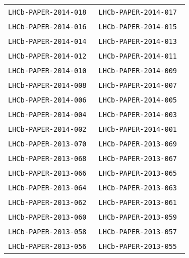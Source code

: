 \begin{center}
\begin{longtable}{ll}
\texttt{LHCb-PAPER-2014-018}~\cite{LHCb-PAPER-2014-018} &
\texttt{LHCb-PAPER-2014-017}~\cite{LHCb-PAPER-2014-017} \\
\texttt{LHCb-PAPER-2014-016}~\cite{LHCb-PAPER-2014-016} &
\texttt{LHCb-PAPER-2014-015}~\cite{LHCb-PAPER-2014-015} \\
\texttt{LHCb-PAPER-2014-014}~\cite{LHCb-PAPER-2014-014} &
\texttt{LHCb-PAPER-2014-013}~\cite{LHCb-PAPER-2014-013} \\
\texttt{LHCb-PAPER-2014-012}~\cite{LHCb-PAPER-2014-012} &
\texttt{LHCb-PAPER-2014-011}~\cite{LHCb-PAPER-2014-011} \\
\texttt{LHCb-PAPER-2014-010}~\cite{LHCb-PAPER-2014-010} &
\texttt{LHCb-PAPER-2014-009}~\cite{LHCb-PAPER-2014-009} \\
\texttt{LHCb-PAPER-2014-008}~\cite{LHCb-PAPER-2014-008} &
\texttt{LHCb-PAPER-2014-007}~\cite{LHCb-PAPER-2014-007} \\
\texttt{LHCb-PAPER-2014-006}~\cite{LHCb-PAPER-2014-006} &
\texttt{LHCb-PAPER-2014-005}~\cite{LHCb-PAPER-2014-005} \\
\texttt{LHCb-PAPER-2014-004}~\cite{LHCb-PAPER-2014-004} &
\texttt{LHCb-PAPER-2014-003}~\cite{LHCb-PAPER-2014-003} \\
\texttt{LHCb-PAPER-2014-002}~\cite{LHCb-PAPER-2014-002} &
\texttt{LHCb-PAPER-2014-001}~\cite{LHCb-PAPER-2014-001} \\
\hline
\texttt{LHCb-PAPER-2013-070}~\cite{LHCb-PAPER-2013-070} &
\texttt{LHCb-PAPER-2013-069}~\cite{LHCb-PAPER-2013-069} \\
\texttt{LHCb-PAPER-2013-068}~\cite{LHCb-PAPER-2013-068} &
\texttt{LHCb-PAPER-2013-067}~\cite{LHCb-PAPER-2013-067} \\
\texttt{LHCb-PAPER-2013-066}~\cite{LHCb-PAPER-2013-066} &
\texttt{LHCb-PAPER-2013-065}~\cite{LHCb-PAPER-2013-065} \\
\texttt{LHCb-PAPER-2013-064}~\cite{LHCb-PAPER-2013-064} &
\texttt{LHCb-PAPER-2013-063}~\cite{LHCb-PAPER-2013-063} \\
\texttt{LHCb-PAPER-2013-062}~\cite{LHCb-PAPER-2013-062} &
\texttt{LHCb-PAPER-2013-061}~\cite{LHCb-PAPER-2013-061} \\
\texttt{LHCb-PAPER-2013-060}~\cite{LHCb-PAPER-2013-060} &
\texttt{LHCb-PAPER-2013-059}~\cite{LHCb-PAPER-2013-059} \\
\texttt{LHCb-PAPER-2013-058}~\cite{LHCb-PAPER-2013-058} &
\texttt{LHCb-PAPER-2013-057}~\cite{LHCb-PAPER-2013-057} \\
\texttt{LHCb-PAPER-2013-056}~\cite{LHCb-PAPER-2013-056} &
\texttt{LHCb-PAPER-2013-055}~\cite{LHCb-PAPER-2013-055} \\

\end{longtable}
\end{center}
